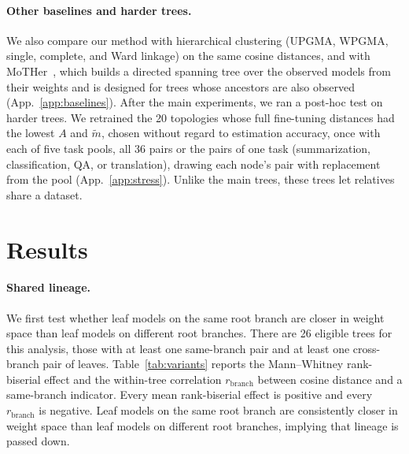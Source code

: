 \documentclass{article}
\theoremstyle{definition}
\theoremstyle{plain}
\newif\ifrevision
\newcommand{\rev}[1]{\ifrevision{\color{blue}#1}\else#1\fi}
\newcommand{\revtag}[1]{\ifrevision\textsuperscript{\color{blue}\sffamily\scriptsize[#1]}\fi}
\begin{document}
\paragraph{\rev{Other baselines and harder trees.}}
\label{sec:exp:harder}
\rev{We also compare our method with hierarchical clustering (UPGMA, WPGMA, single, complete, and Ward linkage) on the same cosine distances, and with MoTHer~\citep{horwitz2025mother}, which builds a directed spanning tree over the observed models from their weights and is designed for trees whose ancestors are also observed (App.~\ref{app:baselines}).}\revtag{tWEn W3; S8sV Q1} \rev{After the main experiments, we ran a post-hoc test on harder trees. We retrained the 20 topologies whose full fine-tuning distances had the lowest $A$ and $\widetilde m$, chosen without regard to estimation accuracy, once with each of five task pools, all 36 pairs or the pairs of one task (summarization, classification, QA, or translation), drawing each node's pair with replacement from the pool (App.~\ref{app:stress}). Unlike the main trees, these trees let relatives share a dataset.}\revtag{tWEn W1, W2; S8sV Q2}


\section{Results}
\label{sec:results}


\paragraph{Shared lineage.}
We first test whether leaf models on the same root branch are closer in weight space than leaf models on different root branches. There are 26 eligible trees for this analysis, those with at least one same-branch pair and at least one cross-branch pair of leaves. Table~\ref{tab:variants} reports the Mann--Whitney rank-biserial effect and the within-tree correlation $r_{\mathrm{branch}}$ between cosine distance and a same-branch indicator. Every mean rank-biserial effect is positive and every $r_{\mathrm{branch}}$ is negative. Leaf models on the same root branch are consistently closer in weight space than leaf models on different root branches, implying that lineage is passed down.
\end{document}
